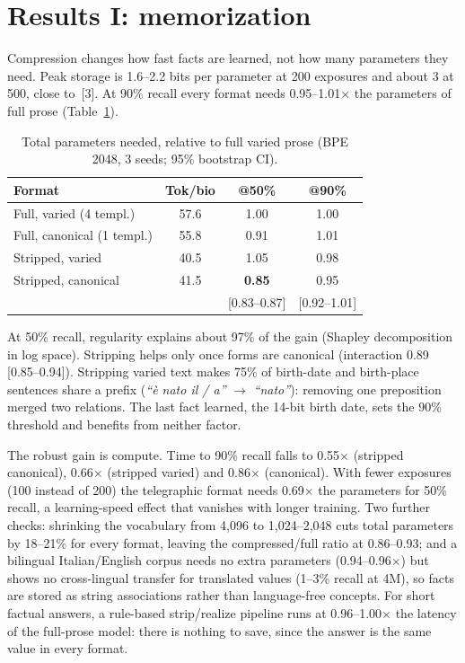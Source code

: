 \documentclass[10pt,a4paper,twocolumn]{article}
\begin{document}
\section{Results I: memorization}
Compression changes how fast facts are learned, not how many parameters they need. Peak storage is 1.6--2.2 bits per parameter at 200 exposures and about 3 at 500, close to~[3]. At 90\% recall every format needs 0.95--1.01$\times$ the parameters of full prose (Table~\ref{tab:2x2}).

\begin{table}[!htb]
\centering\small
\caption{Total parameters needed, relative to full varied prose (BPE 2048, 3 seeds; 95\% bootstrap CI).}
\label{tab:2x2}
\begin{tabular}{@{}lccc@{}}
\toprule
Format & Tok/bio & @50\% & @90\% \\
\midrule
Full, varied (4 templ.) & 57.6 & 1.00 & 1.00 \\
Full, canonical (1 templ.) & 55.8 & 0.91 & 1.01 \\
Stripped, varied & 40.5 & 1.05 & 0.98 \\
Stripped, canonical & 41.5 & \textbf{0.85} & 0.95 \\
 & & {\scriptsize [0.83--0.87]} & {\scriptsize [0.92--1.01]} \\
\bottomrule
\end{tabular}
\end{table}


At 50\% recall, regularity explains about 97\% of the gain (Shapley decomposition in log space). Stripping helps only once forms are canonical (interaction 0.89 [0.85--0.94]). Stripping varied text makes 75\% of birth-date and birth-place sentences share a prefix (\emph{``è nato il / a''} $\rightarrow$ \emph{``nato''}): removing one preposition merged two relations. The last fact learned, the 14-bit birth date, sets the 90\% threshold and benefits from neither factor.

The robust gain is compute. Time to 90\% recall falls to 0.55$\times$ (stripped canonical), 0.66$\times$ (stripped varied) and 0.86$\times$ (canonical). With fewer exposures (100 instead of 200) the telegraphic format needs 0.69$\times$ the parameters for 50\% recall, a learning-speed effect that vanishes with longer training. Two further checks: shrinking the vocabulary from 4,096 to 1,024--2,048 cuts total parameters by 18--21\% for every format, leaving the compressed/full ratio at 0.86--0.93; and a bilingual Italian/English corpus needs no extra parameters (0.94--0.96$\times$) but shows no cross-lingual transfer for translated values (1--3\% recall at 4M), so facts are stored as string associations rather than language-free concepts. For short factual answers, a rule-based strip/realize pipeline runs at 0.96--1.00$\times$ the latency of the full-prose model: there is nothing to save, since the answer is the same value in every format.
\end{document}
